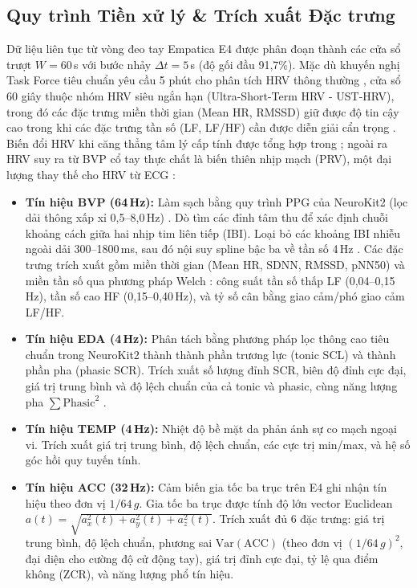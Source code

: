 \documentclass[conference]{IEEEtran}
\begin{document}
\subsection{Quy trình Tiền xử lý \& Trích xuất Đặc trưng}
Dữ liệu liên tục từ vòng đeo tay Empatica E4 được phân đoạn thành các cửa sổ trượt $W = 60$\,s với bước nhảy $\Delta t = 5$\,s (độ gối đầu 91,7\%). Mặc dù khuyến nghị Task Force tiêu chuẩn yêu cầu 5 phút cho phân tích HRV thông thường \cite{taskforce1996heart}, cửa sổ 60 giây thuộc nhóm HRV siêu ngắn hạn (Ultra-Short-Term HRV - UST-HRV), trong đó các đặc trưng miền thời gian (Mean HR, RMSSD) giữ được độ tin cậy cao trong khi các đặc trưng tần số (LF, LF/HF) cần được diễn giải cẩn trọng \cite{pecchia2018ultra, munoz2015validity}. Biến đổi HRV khi căng thẳng tâm lý cấp tính được tổng hợp trong \cite{castaldo2015acute}; ngoài ra HRV suy ra từ BVP cổ tay thực chất là biến thiên nhịp mạch (PRV), một đại lượng thay thế cho HRV từ ECG \cite{schafer2013how}:
\begin{itemize}
    \item \textbf{Tín hiệu BVP (64\,Hz):} Làm sạch bằng quy trình PPG của NeuroKit2 (lọc dải thông xấp xỉ 0,5--8,0\,Hz) \cite{makowski2021neurokit2}. Dò tìm các đỉnh tâm thu để xác định chuỗi khoảng cách giữa hai nhịp tim liên tiếp (IBI). Loại bỏ các khoảng IBI nhiễu ngoài dải 300--1800\,ms, sau đó nội suy spline bậc ba về tần số 4\,Hz \cite{tarvainen2014kubios}. Các đặc trưng trích xuất gồm miền thời gian (Mean HR, SDNN, RMSSD, pNN50) và miền tần số qua phương pháp Welch \cite{welch1967use}: công suất tần số thấp LF (0,04--0,15\,Hz), tần số cao HF (0,15--0,40\,Hz), và tỷ số cân bằng giao cảm/phó giao cảm LF/HF.
    \item \textbf{Tín hiệu EDA (4\,Hz):} Phân tách bằng phương pháp lọc thông cao tiêu chuẩn trong NeuroKit2 \cite{makowski2021neurokit2, boucsein2012electrodermal} thành thành phần trương lực (tonic SCL) và thành phần pha (phasic SCR). Trích xuất số lượng đỉnh SCR, biên độ đỉnh cực đại, giá trị trung bình và độ lệch chuẩn của cả tonic và phasic, cùng năng lượng pha $\sum \text{Phasic}^2$ \cite{boucsein2012electrodermal}.
    \item \textbf{Tín hiệu TEMP (4\,Hz):} Nhiệt độ bề mặt da phản ánh sự co mạch ngoại vi. Trích xuất giá trị trung bình, độ lệch chuẩn, các cực trị min/max, và hệ số góc hồi quy tuyến tính.
    \item \textbf{Tín hiệu ACC (32\,Hz):} Cảm biến gia tốc ba trục trên E4 ghi nhận tín hiệu theo đơn vị $1/64\,g$. Gia tốc ba trục được tính độ lớn vector Euclidean $a(t) = \sqrt{a_x^2(t) + a_y^2(t) + a_z^2(t)}$. Trích xuất đủ 6 đặc trưng: giá trị trung bình, độ lệch chuẩn, phương sai $\text{Var}(\text{ACC})$ (theo đơn vị $(1/64\,g)^2$, đại diện cho cường độ cử động tay), giá trị đỉnh cực đại, tỷ lệ qua điểm không (ZCR), và năng lượng phổ tín hiệu.
\end{itemize}
\end{document}
